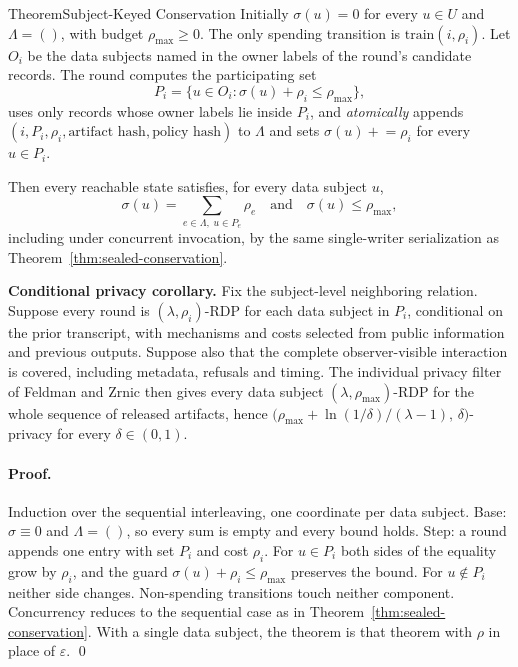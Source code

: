 \begin{pdclaim}{Theorem}{Subject-Keyed Conservation}
\setlength{\parskip}{4pt plus 1pt}
\label{thm:sealed-person-ledger}
Initially $\sigma(u)=0$ for every $u\in U$ and $\Lambda=()$, with budget
$\rho_{\max}\ge0$. The only spending transition is $\mathrm{train}(i,\rho_i)$. Let
$O_i$ be the data subjects named in the owner labels of the round's candidate
records. The round computes the participating set
\[
P_i=\{u\in O_i:\sigma(u)+\rho_i\le \rho_{\max}\},
\]
uses only records whose owner labels lie inside $P_i$, and \emph{atomically}
appends $(i,P_i,\rho_i,\text{artifact hash},\text{policy hash})$ to $\Lambda$
and sets $\sigma(u)\mathrel{+}=\rho_i$ for every $u\in P_i$.

Then every reachable state satisfies, for every data subject $u$,
\[
\sigma(u)=\sum_{e\in\Lambda,\;u\in P_e}\rho_e
\quad\text{and}\quad
\sigma(u)\le \rho_{\max},
\]
including under concurrent invocation, by the same single-writer
serialization as Theorem~\ref{thm:sealed-conservation}.

\textbf{Conditional privacy corollary.} Fix the subject-level neighboring
relation. Suppose every round is
$(\lambda,\rho_i)$-RDP for each data subject in $P_i$, conditional on the prior
transcript, with mechanisms and costs selected from public information and
previous outputs. Suppose also that the complete observer-visible interaction
is covered, including metadata, refusals and timing. The individual privacy
filter of Feldman and Zrnic  then gives every data subject
$(\lambda,\rho_{\max})$-RDP for the whole sequence of released artifacts, hence
$\bigl(\rho_{\max}+\ln(1/\delta)/(\lambda-1),\,\delta\bigr)$-privacy for every
$\delta\in(0,1)$.
\end{pdclaim}

\paragraph{Proof.}
Induction over the sequential interleaving, one coordinate per data subject. Base:
$\sigma\equiv0$ and $\Lambda=()$, so every sum is empty and every bound holds.
Step: a round appends one entry with set $P_i$ and cost $\rho_i$.
For $u\in P_i$ both sides of the equality grow by $\rho_i$, and the guard
$\sigma(u)+\rho_i\le \rho_{\max}$ preserves the bound. For $u\notin P_i$ neither side
changes. Non-spending transitions touch neither component. Concurrency reduces
to the sequential case as in Theorem~\ref{thm:sealed-conservation}. With a
single data subject, the theorem is that theorem with $\rho$ in place of
$\varepsilon$. \qed

